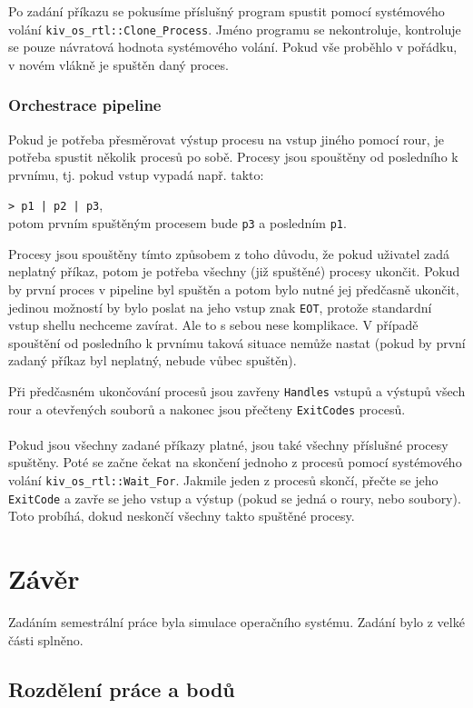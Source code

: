 \documentclass[12pt, a4paper]{article}
\let\oldsection\section
\renewcommand\section{\clearpage\oldsection}
\begin{document}
	
	Po zadání příkazu se pokusíme příslušný program spustit pomocí systémového volání \texttt{kiv_os_rtl::Clone_Process}. Jméno programu se nekontroluje, kontroluje se pouze návratová hodnota systémového volání. Pokud vše proběhlo v pořádku, v novém vlákně je spuštěn daný proces.
	
	\subsubsection{Orchestrace pipeline} 
	Pokud je potřeba přesměrovat výstup procesu na vstup jiného pomocí rour, je potřeba spustit několik procesů po sobě. Procesy jsou spouštěny od posledního k prvnímu, tj. pokud vstup vypadá např. takto:
	
	
	\texttt{> p1 | p2 | p3},\\
	potom prvním spuštěným procesem bude \texttt{p3} a posledním \texttt{p1}.
	
	Procesy jsou spouštěny tímto způsobem z toho důvodu, že pokud uživatel zadá neplatný příkaz, potom je potřeba všechny (již spuštěné) procesy ukončit. Pokud by první proces v pipeline byl spuštěn a potom bylo nutné jej předčasně ukončit, jedinou možností by bylo poslat na jeho vstup znak \texttt{EOT}, protože standardní vstup shellu nechceme zavírat. Ale to s sebou nese komplikace. V případě spouštění od posledního k prvnímu taková situace nemůže nastat (pokud by první zadaný příkaz byl neplatný, nebude vůbec spuštěn).
	
	Při předčasném ukončování procesů jsou zavřeny \texttt{Handles} vstupů a výstupů všech rour a otevřených souborů a nakonec jsou přečteny \texttt{ExitCodes} procesů.
	\\
	\\
	Pokud jsou všechny zadané příkazy platné, jsou také všechny příslušné procesy spuštěny. Poté se začne čekat na skončení jednoho z procesů pomocí systémového volání \texttt{kiv_os_rtl::Wait_For}. Jakmile jeden z procesů skončí, přečte se jeho \texttt{ExitCode} a zavře se jeho vstup a výstup (pokud se jedná o roury, nebo soubory). Toto probíhá, dokud neskončí všechny takto spuštěné procesy.


\section{Závěr}	

Zadáním semestrální práce byla simulace operačního systému. Zadání bylo z velké části splněno.

\subsection{Rozdělení práce a bodů}
\end{document}
